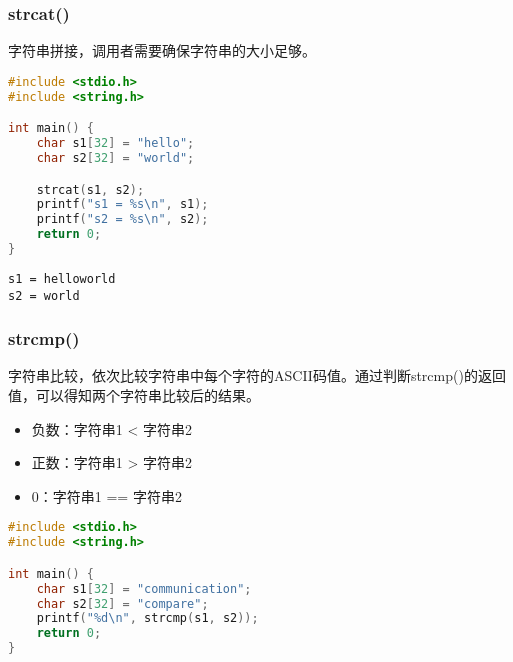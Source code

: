 \vspace{0.5cm}

\subsubsection{strcat()}

字符串拼接，调用者需要确保字符串的大小足够。\\


\begin{lstlisting}[language=C]
#include <stdio.h>
#include <string.h>

int main() {
	char s1[32] = "hello";
	char s2[32] = "world";

	strcat(s1, s2);
	printf("s1 = %s\n", s1);
	printf("s2 = %s\n", s2);
	return 0;
}
\end{lstlisting}

\begin{tcolorbox}
	\begin{verbatim}
s1 = helloworld
s2 = world
	\end{verbatim}
\end{tcolorbox}

\vspace{0.5cm}

\subsubsection{strcmp()}

字符串比较，依次比较字符串中每个字符的ASCII码值。通过判断strcmp()的返回值，可以得知两个字符串比较后的结果。

\begin{itemize}
	\item 负数：字符串1 < 字符串2
	\item 正数：字符串1 > 字符串2
	\item 0：字符串1 == 字符串2
\end{itemize}

\vspace{0.5cm}


\begin{lstlisting}[language=C]
#include <stdio.h>
#include <string.h>

int main() {
	char s1[32] = "communication";
	char s2[32] = "compare";
	printf("%d\n", strcmp(s1, s2));
	return 0;
}
\end{lstlisting}

